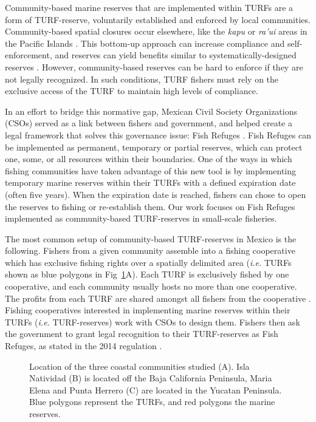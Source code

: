 \documentclass[10pt,letterpaper]{article}
\providecommand{\DIFaddtex}[1]{{\protect\color{blue}\uwave{#1}}} %
\providecommand{\DIFaddbegin}{} %
\providecommand{\DIFaddend}{} %
\providecommand{\DIFadd}[1]{\texorpdfstring{\DIFaddtex{#1}}{#1}} %
\newcommand{\DIFaddincludegraphics}[2][]{{\color{blue}\fbox{\DIFOincludegraphics[#1]{#2}}}} %
\DeclareRobustCommand{\DIFaddbegin}{\DIFOaddbegin \let\includegraphics\DIFaddincludegraphics} %
\DeclareRobustCommand{\DIFaddend}{\DIFOaddend \let\includegraphics\DIFOincludegraphics} %
\begin{document}
Community-based marine reserves that are implemented within TURFs are a form of TURF-reserve, voluntarily established and enforced by local communities. Community-based spatial closures occur elsewhere, like the \emph{kapu} or \emph{ra’ui} areas in the Pacific Islands \cite{johannes_2002,bohnsack_2004}. This bottom-up approach can increase compliance and self-enforcement, and reserves can yield benefits similar to systematically-designed reserves \cite{beger_2004,smallhornwest_2018}. However, community-based reserves can be hard to enforce if they are not legally recognized. In such conditions, TURF fishers must rely on the exclusive access of the TURF to maintain high levels of compliance.

In an effort to bridge this normative gap, Mexican Civil Society Organizations (CSOs) served as a link between fishers and government, and helped create a legal framework that solves this governance issue: Fish Refuges \cite{nom}. Fish Refuges can be implemented as permanent, temporary or partial reserves, which can protect one, some, or all resources within their boundaries. One of the ways in which fishing communities have taken advantage of this new tool is by implementing temporary marine reserves within their TURFs with a defined expiration date (often five years). When the expiration date is reached, fishers can chose to open the reserves to fishing or re-establish them. Our work focuses on Fish Refuges implemented as community-based TURF-reserves in small-scale fisheries.

The most common setup of community-based TURF-reserves in Mexico is the following. Fishers from a given community assemble into a fishing cooperative which has exclusive fishing rights over a spatially delimited area (\emph{i.e.} TURFs shown as blue polygons in Fig~\ref{fig:map}A). Each TURF is exclusively fished by one cooperative, and each community usually hosts no more than one cooperative. The profits from each TURF are shared amongst all fishers from the cooperative \DIFaddbegin \DIFadd{\mbox{%
\cite{mccay_2014,mccay_2017}}\hspace{0pt}%
}\DIFaddend . Fishing cooperatives interested in implementing marine reserves within their TURFs (\emph{i.e.} TURF-reserves) work with CSOs to design them. Fishers then ask the government to grant legal recognition to their TURF-reserves as Fish Refuges, as stated in the 2014 regulation \cite{nom}.

\begin{figure}[!h]
\centering
\caption{Location of the three coastal communities studied (A). Isla Natividad (B) is located off the Baja California Peninsula, Maria Elena and Punta Herrero (C) are located in the Yucatan Peninsula. Blue polygons represent the TURFs, and red polygons the marine reserves.}
\label{fig:map}
\end{figure}
\end{document}
